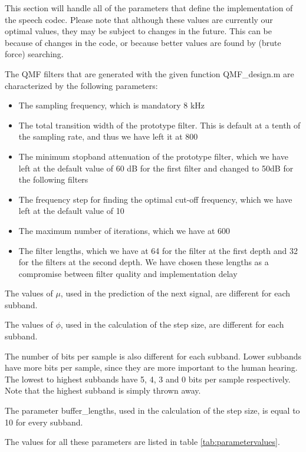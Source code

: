 \documentclass[a4paper]{article}
\begin{document}
This section will handle all of the parameters that define the implementation of the speech codec. Please note that although these values are currently our optimal values, they may be subject to changes in the future. This can be because of changes in the code, or because better values are found by (brute force) searching.

The QMF filters that are generated with the given function QMF\_design.m are characterized by the following parameters:

\begin{itemize}
\item The sampling frequency, which is mandatory 8 kHz
\item The total transition width of the prototype filter. This is default at a tenth of the sampling rate, and thus we have left it at 800
\item The minimum stopband attenuation of the prototype filter, which we have left at the default value of 60 dB for the first filter and changed to 50dB for the following filters
\item The frequency step for finding the optimal cut-off frequency, which we have left at the default value of 10
\item The maximum number of iterations, which we have at 600
\item The filter lengths, which we have at 64 for the filter at the first depth and 32 for the filters at the second depth. We have chosen these lengths as a compromise between filter quality and implementation delay
\
\end{itemize}

The values of $\mu$, used in the prediction of the next signal, are different for each subband. 

The values of $\phi$, used in the calculation of the step size, are different for each subband. 

The number of bits per sample is also different for each subband. Lower subbands have more bits per sample, since they are more important to the human hearing. The lowest to highest subbands have 5, 4, 3 and 0 bits per sample respectively. Note that the highest subband is simply thrown away.

The parameter buffer\_lengths, used in the calculation of the step size, is equal to 10 for every subband.

The values for all these parameters are listed in table \ref{tab:parametervalues}.
\end{document}

